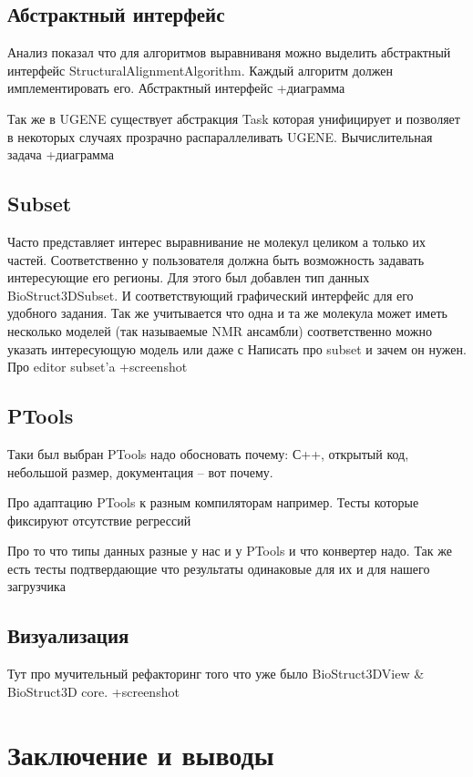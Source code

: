 \documentclass[a4paper, 12pt, titlepage, utf8]{extarticle}
\let\oldsection\section         %
\renewcommand{\section}{\newpage\oldsection}
\begin{document}
\subsection{Абстрактный интерфейс}
Анализ показал что для алгоритмов выравниваня можно выделить абстрактный интерфейс StructuralAlignmentAlgorithm. Каждый алгоритм должен имплементировать его.
Абстрактный интерфейс +диаграмма

Так же в UGENE существует абстракция Task которая унифицирует и позволяет в некоторых случаях прозрачно распараллеливать UGENE.
Вычислительная задача +диаграмма

\subsection{Subset}
Часто представляет интерес выравнивание не молекул целиком а только их частей. Соответственно у пользователя должна быть возможность задавать интересующие его регионы. Для этого был добавлен тип данных BioStruct3DSubset. И соответствующий графический интерфейс для его удобного задания. Так же учитывается что одна и та же молекула может иметь несколько моделей (так называемые NMR ансамбли) соответственно можно указать интересующую модель или даже с
Написать про subset и зачем он нужен. 
Про editor subset'a
+screenshot

\subsection{PTools}
Таки был выбран PTools надо обосновать почему: С++, открытый код, небольшой размер, документация -- вот почему.

Про адаптацию PTools к разным компиляторам например.
Тесты которые фиксируют отсутствие регрессий

Про то что типы данных разные у нас и у PTools и что конвертер надо.
Так же есть тесты подтвердающие что результаты одинаковые для их и для нашего загрузчика

\subsection{Визуализация}
Тут про мучительный рефакторинг того что уже было BioStruct3DView \& BioStruct3D core.
+screenshot


\section{Заключение и выводы}
\end{document}
